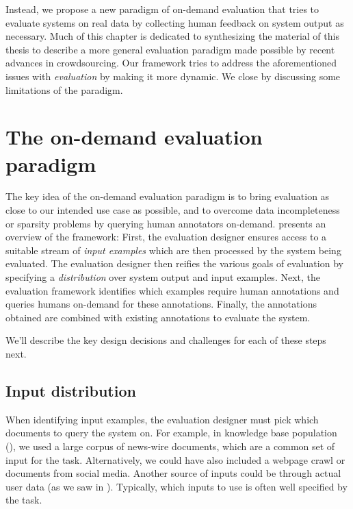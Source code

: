 Instead, we propose a new paradigm of on-demand evaluation that tries to evaluate systems on real data by collecting human feedback on system output as necessary.
Much of this chapter is dedicated to synthesizing the material of this thesis to describe a more general evaluation paradigm made possible by recent advances in crowdsourcing.
Our framework tries to address the aforementioned issues with \textit{evaluation} by making it more dynamic.
We close by discussing some limitations of the paradigm.

\section{The on-demand evaluation paradigm}

The key idea of the on-demand evaluation paradigm is to bring evaluation as close to our intended use case as possible, and to overcome data incompleteness or sparsity problems by querying human annotators on-demand.
 presents an overview of the framework: 
First, the evaluation designer ensures access to a suitable stream of \textit{input examples}
which are then processed by the system being evaluated.
The evaluation designer then reifies the various goals of evaluation by specifying a \textit{distribution} over system output and input examples.
Next, the evaluation framework identifies which examples require human annotations and queries humans on-demand for these annotations. 
Finally, the annotations obtained are combined with existing annotations to evaluate the system.

We'll describe the key design decisions and challenges for each of these steps next.

\subsection{Input distribution}
When identifying input examples, the evaluation designer must pick which documents to query the system on.
For example, in knowledge base population (), we used a large corpus of news-wire documents, which are a common set of input for the task.
Alternatively, we could have also included a webpage crawl or documents from social media.
Another source of inputs could be through actual user data (as we saw in ).
Typically, which inputs to use is often well specified by the task.

